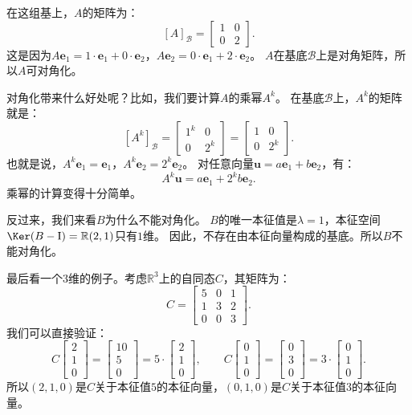 \documentclass[12pt,UTF8]{ctexbook}
\begin{document}
在这组基上，$A$的矩阵为：
$$
[A]_{\mathcal{B}} = \begin{bmatrix} 1 & 0 \\ 0 & 2 \end{bmatrix}.
$$
这是因为$A\mathbf{e}_1 = 1\cdot\mathbf{e}_1 + 0\cdot\mathbf{e}_2$，$A\mathbf{e}_2 = 0\cdot\mathbf{e}_1 + 2\cdot\mathbf{e}_2$。
$A$在基底$\mathcal{B}$上是对角矩阵，所以$A$可对角化。

对角化带来什么好处呢？比如，我们要计算$A$的乘幂$A^k$。
在基底$\mathcal{B}$上，$A^k$的矩阵就是：
$$
[A^k]_{\mathcal{B}} = \begin{bmatrix} 1^k & 0 \\ 0 & 2^k \end{bmatrix} = \begin{bmatrix} 1 & 0 \\ 0 & 2^k \end{bmatrix}.
$$
也就是说，$A^k\mathbf{e}_1 = \mathbf{e}_1$，$A^k\mathbf{e}_2 = 2^k\mathbf{e}_2$。
对任意向量$\mathbf{u} = a\mathbf{e}_1 + b\mathbf{e}_2$，有：
$$
A^k\mathbf{u} = a\mathbf{e}_1 + 2^k b\mathbf{e}_2.
$$
乘幂的计算变得十分简单。

反过来，我们来看$B$为什么不能对角化。
$B$的唯一本征值是$\lambda = 1$，本征空间$\Ker(B - \mathrm{I}) = \mathbb{R} (2,1)$只有$1$维。
因此，不存在由本征向量构成的基底。所以$B$不能对角化。

最后看一个$3$维的例子。考虑$\mathbb{R}^3$上的自同态$C$，其矩阵为：
$$
C = \begin{bmatrix} 5 & 0 & 1 \\ 1 & 3 & 2 \\ 0 & 0 & 3 \end{bmatrix}.
$$
我们可以直接验证：
$$
C \begin{bmatrix} 2 \\ 1 \\ 0 \end{bmatrix} = \begin{bmatrix} 10 \\ 5 \\ 0 \end{bmatrix} = 5 \cdot \begin{bmatrix} 2 \\ 1 \\ 0 \end{bmatrix},
\qquad
C \begin{bmatrix} 0 \\ 1 \\ 0 \end{bmatrix} = \begin{bmatrix} 0 \\ 3 \\ 0 \end{bmatrix} = 3 \cdot \begin{bmatrix} 0 \\ 1 \\ 0 \end{bmatrix}.
$$
所以$(2,1,0)$是$C$关于本征值$5$的本征向量，$(0,1,0)$是$C$关于本征值$3$的本征向量。
\end{document}
